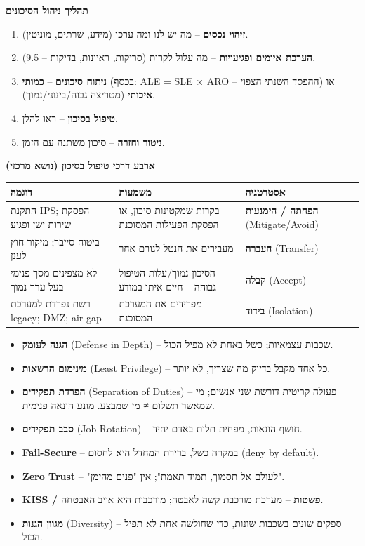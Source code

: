 \documentclass[11pt]{article}
\newcommand{\enLR}[1]{\textenglish{#1}}
\newcommand{\sectionheading}[1]{\vskip10pt\penalty-200{\large\bfseries\color{h2}#1\par}\vskip3pt}
\newcommand{\subheading}[1]{\vskip6pt{\bfseries\color{h3}#1\par}\vskip2pt}
\begin{document}
\subheading{תהליך ניהול הסיכונים}

\begin{enumerate}
\item \textbf{זיהוי נכסים} – מה יש לנו ומה ערכו (מידע, שרתים, מוניטין).
\item \textbf{הערכת איומים ופגיעויות} – מה עלול לקרות (סריקות, ראיונות, בדיקות – \enLR{9.5).}
\item \textbf{ניתוח סיכונים} – \textbf{כמותי} (בכסף: \enLR{ALE = SLE} × \enLR{ARO} – ההפסד השנתי הצפוי) או \textbf{איכותי} (מטריצה גבוה/בינוני/נמוך).
\item \textbf{טיפול בסיכון} – ראו להלן.
\item \textbf{ניטור וחזרה} – סיכון משתנה עם הזמן.
\end{enumerate}

\subheading{ארבע דרכי טיפול בסיכון (נושא מרכזי)}

\begin{xltabular}{\linewidth}{|>{\setRTL\raggedleft\arraybackslash}X|>{\setRTL\raggedleft\arraybackslash}X|>{\setRTL\raggedleft\arraybackslash}X|}
\hline
{}\textbf{דוגמה} & \textbf{משמעות} & \textbf{אסטרטגיה} \\
\hline
\endhead
התקנת \enLR{IPS}; הפסקת שירות ישן ופגיע & בקרות שמקטינות סיכון, או הפסקת הפעילות המסוכנת & \textbf{הפחתה / הימנעות} \enLR{(Mitigate/Avoid)} \\
\hline
ביטוח סייבר; מיקור חוץ לענן & מעבירים את הנטל לגורם אחר & \textbf{העברה} \enLR{(Transfer)} \\
\hline
לא מצפינים מסך פנימי בעל ערך נמוך & הסיכון נמוך/עלות הטיפול גבוהה – חיים איתו במודע & \textbf{קבלה} \enLR{(Accept)} \\
\hline
רשת נפרדת למערכת \enLR{legacy; DMZ; air-gap} & מפרידים את המערכת המסוכנת & \textbf{בידוד} \enLR{(Isolation)} \\
\hline
\end{xltabular}

\sectionheading{\enLR{9.3} עקרונות עיצוב רשת מאובטחת}

\begin{itemize}
\item \textbf{הגנה לעומק} \enLR{(Defense in Depth)} – שכבות עצמאיות; כשל באחת לא מפיל הכול.
\item \textbf{מינימום הרשאות} \enLR{(Least Privilege)} – כל אחד מקבל בדיוק מה שצריך, לא יותר.
\item \textbf{הפרדת תפקידים} \enLR{(Separation of Duties)} – פעולה קריטית דורשת שני אנשים; מי שמאשר תשלום ≠ מי שמבצע. מונע הונאה פנימית.
\item \textbf{סבב תפקידים} \enLR{(Job Rotation)} – חושף הונאות, מפחית תלות באדם יחיד.
\item \textbf{\enLR{Fail-Secure}} – במקרה כשל, ברירת המחדל היא לחסום \enLR{(deny by default).}
\item \textbf{\enLR{Zero Trust}} – "לעולם אל תסמוך, תמיד תאמת"; אין "פנים מהימן".
\item \textbf{\enLR{KISS} / פשטות} – מערכת מורכבת קשה לאבטח; מורכבות היא אויב האבטחה.
\item \textbf{מגוון הגנות} \enLR{(Diversity)} – ספקים שונים בשכבות שונות, כדי שחולשה אחת לא תפיל הכול.
\end{itemize}
\end{document}
